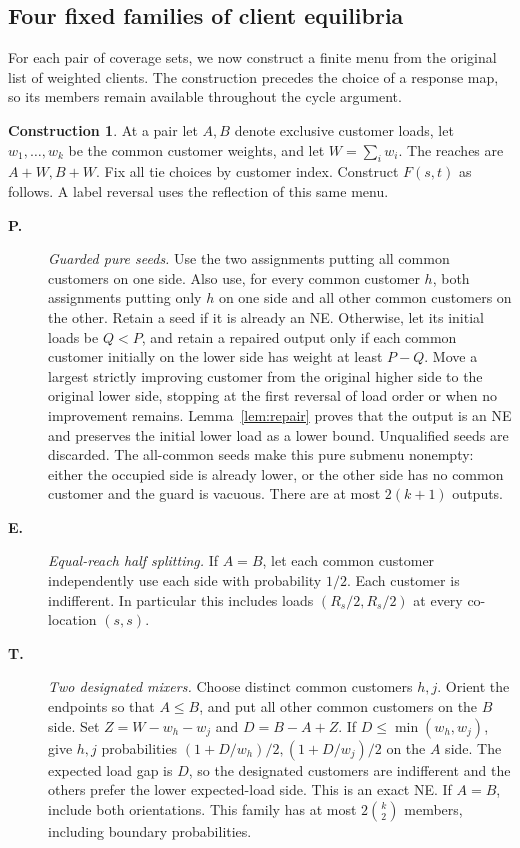 \documentclass[11pt]{amsart}
\numberwithin{equation}{section}
\theoremstyle{definition}
\newtheorem{construction}[theorem]{Construction}
\begin{document}
\subsection{Four fixed families of client equilibria}\label{sec:menu}
For each pair of coverage sets, we now construct a finite menu from the original list of weighted clients. The construction precedes the choice of a response map, so its members remain available throughout the cycle argument.
\begin{construction}\label{con:menu}
At a pair let $A,B$ denote exclusive customer loads, let
$w_1,\ldots,w_k$ be the common customer weights, and let $W=\sum_iw_i$.
The reaches are $A+W,B+W$. Fix all tie choices by customer index.
Construct $F(s,t)$ as follows. A label reversal uses the reflection of this same menu.
\begin{description}

\item[\textbf{P.}] \emph{Guarded pure seeds.}
Use the two assignments putting all common customers on one side. Also use,
for every common customer $h$, both assignments putting only $h$ on one side
and all other common customers on the other. Retain a seed if it is already
an NE. Otherwise, let its initial loads be $Q<P$, and retain a repaired
output only if each common customer initially on the lower side has weight
at least $P-Q$. Move a largest strictly improving customer from the original
higher side to the original lower side, stopping at the first reversal of
load order or when no improvement remains. Lemma~\ref{lem:repair} proves
that the output is an NE and preserves the initial lower load as a lower
bound. Unqualified seeds are discarded. The all-common seeds make this
pure submenu nonempty: either the occupied side is already lower, or the
other side has no common customer and the guard is vacuous.
There are at most $2(k+1)$ outputs.

\item[\textbf{E.}] \emph{Equal-reach half splitting.}
If $A=B$, let each common customer independently use each side with
probability $1/2$. Each customer is indifferent. In particular this includes
loads $(R_s/2,R_s/2)$ at every co-location $(s,s)$.

\item[\textbf{T.}] \emph{Two designated mixers.}
Choose distinct common customers $h,j$. Orient the endpoints so that
$A\le B$, and put all other common customers on the $B$ side. Set
$Z=W-w_h-w_j$ and $D=B-A+Z$. If $D\le\min(w_h,w_j)$, give $h,j$
probabilities $(1+D/w_h)/2,(1+D/w_j)/2$ on the $A$ side.
The expected load gap is $D$, so the designated customers are indifferent
and the others prefer the lower expected-load side. This is an exact NE.
If $A=B$, include both orientations. This family has at most
$2\binom{k}{2}$ members, including boundary probabilities.


\end{description}
\end{construction}
\end{document}
